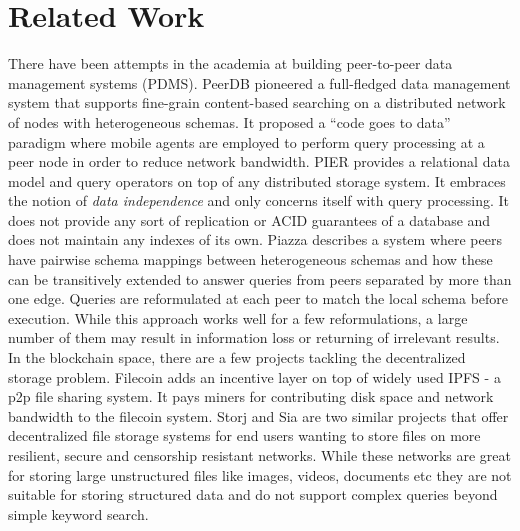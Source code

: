 \section{Related Work}
There have been attempts in the academia at building peer-to-peer data management systems (PDMS). PeerDB \cite{PeerDB} pioneered a full-fledged data management system that supports fine-grain content-based searching on a distributed network of nodes with heterogeneous schemas. It proposed a ``code goes to data'' paradigm where mobile agents are employed to perform query processing at a peer node in order to reduce network bandwidth. PIER \cite{PIER} provides a relational data model and query operators on top of any distributed storage system. It embraces the notion of \textit{data independence} and only concerns itself with query processing. It does not provide any sort of replication or ACID guarantees of a database and does not maintain any indexes of its own. Piazza \cite{Piazza} describes a system where peers have pairwise schema mappings between heterogeneous schemas and how these can be transitively extended to answer queries from peers separated by more than one edge. Queries are reformulated at each peer to match the local schema before execution. While this approach works well for a few reformulations, a large number of them may result in information loss or returning of irrelevant results.
\newline\newline
In the blockchain space, there are a few projects tackling the decentralized storage problem. Filecoin \cite{Filecoin}
adds an incentive layer on top of widely used IPFS \cite{ipfs} - a p2p file sharing system. It pays miners for
contributing disk space and network bandwidth to the filecoin system. Storj \cite{Storj} and Sia \cite{Sia} are two
similar projects that offer decentralized file storage systems for end users wanting to store files on more resilient,
secure and censorship resistant networks. While these networks are great for storing large unstructured files like
images, videos, documents etc they are not suitable for storing structured data and do not support complex queries
beyond simple keyword search.
\newline\newline
